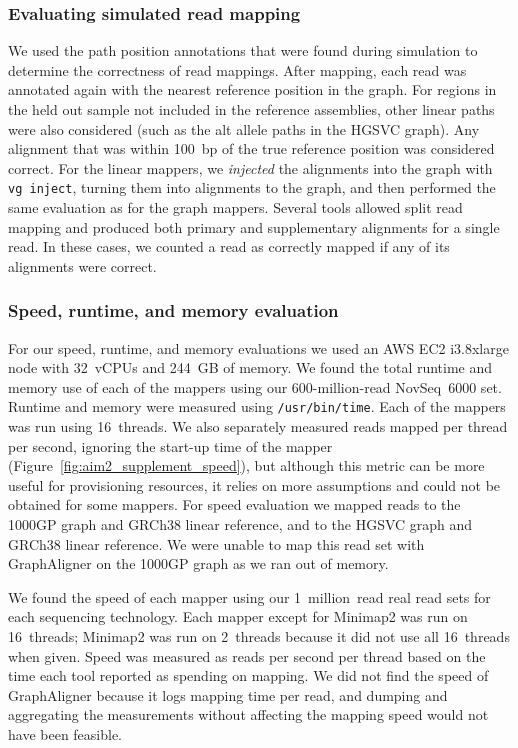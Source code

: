 \documentclass[11pt]{ucscthesis}
\begin{document}
\subsubsection{Evaluating simulated read mapping}

We used the path position annotations that were found during simulation to determine the correctness of read mappings.
After mapping, each read was annotated again with the nearest reference position in the graph.
For regions in the held out sample not included in the reference assemblies, other linear paths were also considered (such as the alt allele paths in the HGSVC graph).
Any alignment that was within 100~bp of the true reference position was considered correct.
For the linear mappers, we \textit{injected} the alignments into the graph with \texttt{vg~inject}, turning them into alignments to the graph, and then performed the same evaluation as for the graph mappers.
Several tools allowed split read mapping and produced both primary and supplementary alignments for a single read.
In these cases, we counted a read as correctly mapped if any of its alignments were correct.


\subsubsection{Speed, runtime, and memory evaluation}
\label{subsec:aim2:srgiraffe_speed}

For our speed, runtime, and memory evaluations we used an AWS EC2 i3.8xlarge node with 32~vCPUs and 244~GB of memory.
We found the total runtime and memory use of each of the mappers using our 600-million-read NovSeq~6000 set.
Runtime and memory were measured using \texttt{/usr/bin/time}.
Each of the mappers was run using 16~threads.
We also separately measured reads mapped per thread per second, ignoring the start-up time of the mapper (Figure~\ref{fig:aim2_supplement_speed}), but although this metric can be more useful for provisioning resources, it relies on more assumptions and could not be obtained for some mappers.
For speed evaluation we mapped reads to the 1000GP graph and GRCh38 linear reference, and to the HGSVC graph and GRCh38 linear reference.
We were unable to map this read set with GraphAligner on the 1000GP graph as we ran out of memory.

We found the speed of each mapper using our 1~million~read real read sets for each sequencing technology.
Each mapper except for Minimap2 was run on 16~threads; Minimap2 was run on 2~threads because it did not use all 16~threads when given.
Speed was measured as reads per second per thread based on the time each tool reported as spending on mapping.
We did not find the speed of GraphAligner because it logs mapping time per read, and dumping and aggregating the measurements without affecting the mapping speed would not have been feasible.
\end{document}
